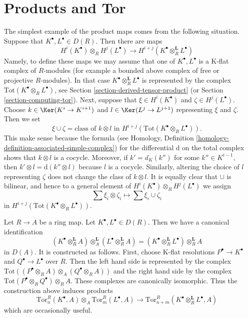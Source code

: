 \section{Products and Tor}
\label{section-products-tor}

\noindent
The simplest example of the product maps comes from the following situation.
Suppose that $K^\bullet, L^\bullet \in D(R)$. Then there are maps
\begin{equation}
\label{equation-simple-tor-product}
H^i(K^\bullet) \otimes_R H^j(L^\bullet)
\longrightarrow
H^{i + j}(K^\bullet \otimes_R^{\mathbf{L}} L^\bullet)
\end{equation}
Namely, to define these maps we may assume that one of $K^\bullet, L^\bullet$
is a K-flat complex of $R$-modules (for example a bounded
above complex of free or projective $R$-modules). In that case
$K^\bullet \otimes_R^{\mathbf{L}} L^\bullet$ is represented by the
complex $\text{Tot}(K^\bullet \otimes_R L^\bullet)$, see
Section \ref{section-derived-tensor-product} (or
Section \ref{section-computing-tor}).
Next, suppose that $\xi \in H^i(K^\bullet)$ and $\zeta \in H^j(L^\bullet)$.
Choose $k \in \Ker(K^i \to K^{i + 1})$ and
$l \in \Ker(L^j \to L^{j + 1})$ representing $\xi$ and $\zeta$.
Then we set
$$
\xi \cup \zeta =
\text{class of }k \otimes l\text{ in }
H^{i + j}(\text{Tot}(K^\bullet \otimes_R L^\bullet)).
$$
This make sense because the formula (see
Homology, Definition \ref{homology-definition-associated-simple-complex})
for the differential $\text{d}$ on the total complex shows that
$k \otimes l$ is a cocycle. Moreover, if $k' = d_K(k'')$ for some
$k'' \in K^{i - 1}$, then $k' \otimes l = \text{d}(k'' \otimes l)$
because $l$ is a cocycle. Similarly, altering the choice of $l$
representing $\zeta$ does not change the class of $k \otimes l$.
It is equally clear that $\cup$ is bilinear, and hence
to a general element of $H^i(K^\bullet) \otimes_R H^j(L^\bullet)$
we assign
$$
\sum \xi_i \otimes \zeta_i \longmapsto \sum \xi_i \cup \zeta_i
$$
in $H^{i + j}(\text{Tot}(K^\bullet \otimes_R L^\bullet))$.

\medskip\noindent
Let $R \to A$ be a ring map. Let $K^\bullet, L^\bullet \in D(R)$.
Then we have a canonical identification
\begin{equation}
\label{equation-pullback-derived-tensor-product}
(K^\bullet \otimes_R^{\mathbf{L}} A)
\otimes_A^{\mathbf{L}}
(L^\bullet \otimes_R^{\mathbf{L}} A)
=
(K^\bullet \otimes_R^{\mathbf{L}} L^\bullet) \otimes_R^{\mathbf{L}} A
\end{equation}
in $D(A)$. It is constructed as follows. First, choose K-flat resolutions
$P^\bullet \to K^\bullet$ and $Q^\bullet \to L^\bullet$
over $R$. Then the left hand side is represented by the complex
$\text{Tot}((P^\bullet \otimes_R A) \otimes_A (Q^\bullet \otimes_R A))$
and the right hand side by the complex
$\text{Tot}(P^\bullet \otimes_R Q^\bullet) \otimes_R A$. These
complexes are canonically isomorphic. Thus the construction above
induces products
$$
\text{Tor}^R_n(K^\bullet, A) \otimes_A \text{Tor}^R_m(L^\bullet, A)
\longrightarrow
\text{Tor}_{n + m}^R(K^\bullet \otimes_R^\mathbf{L} L^\bullet, A)
$$
which are occasionally useful.

